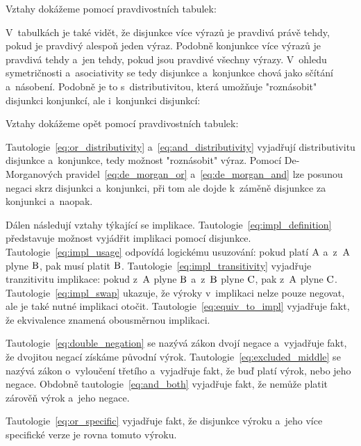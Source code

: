 Vztahy dokážeme pomocí pravdivostních tabulek:



V~tabulkách je také vidět, že disjunkce více výrazů je pravdivá právě tehdy, pokud je pravdivý alespoň jeden výraz. Podobně konjunkce více výrazů je pravdivá tehdy a~jen tehdy, pokud jsou pravdivé všechny výrazy. V~ohledu symetričnosti a~asociativity se tedy disjunkce a~konjunkce chová jako sčítání a~násobení. Podobně je to s~distributivitou, která umožňuje "roznásobit" disjunkci konjunkcí, ale i~konjunkci disjunkcí:


Vztahy dokážeme opět pomocí pravdivostních tabulek:



\begin{fact}
\end{fact}

 Tautologie~\eqref{eq:or_distributivity} a~\eqref{eq:and_distributivity} vyjadřují distributivitu disjunkce a~konjunkce, tedy možnost "roznásobit" výraz. Pomocí De-Morganových pravidel~\eqref{eq:de_morgan_or} a~\eqref{eq:de_morgan_and} lze posunou negaci skrz disjunkci a~konjunkci, při tom ale dojde k~záměně disjunkce za konjunkci a~naopak.

Dálen následují vztahy týkající se implikace. Tautologie~\eqref{eq:impl_definition} představuje možnost vyjádřit implikaci pomocí disjunkce. Tautologie~\eqref{eq:impl_usage} odpovídá logickému usuzování: pokud platí \(\mathrm{A}\) a~z~\(\mathrm{A}\) plyne \(\mathrm{B}\), pak musí platit \(\mathrm{B}\). Tautologie~\eqref{eq:impl_transitivity} vyjadřuje tranzitivitu implikace: pokud z~\(\mathrm{A}\) plyne \(\mathrm{B}\) a~z~\(\mathrm{B}\) plyne \(\mathrm{C}\), pak z~\(\mathrm{A}\) plyne \(\mathrm{C}\). Tautologie~\eqref{eq:impl_swap} ukazuje, že výroky v~implikaci nelze pouze negovat, ale je také nutné implikaci otočit. Tautologie~\eqref{eq:equiv_to_impl} vyjadřuje fakt, že ekvivalence znamená obousměrnou implikaci.

Tautologie~\eqref{eq:double_negation} se nazývá zákon dvojí negace a~vyjadřuje fakt, že dvojitou negací získáme původní výrok. Tautologie~\eqref{eq:excluded_middle} se nazývá zákon o~vyloučení třetího a~vyjadřuje fakt, že buď platí výrok, nebo jeho negace. Obdobně tautologie~\eqref{eq:and_both} vyjadřuje fakt, že nemůže platit zárověň výrok a~jeho negace.

Tautologie~\eqref{eq:or_specific} vyjadřuje fakt, že disjunkce výroku a~jeho více specifické verze je rovna tomuto výroku.

